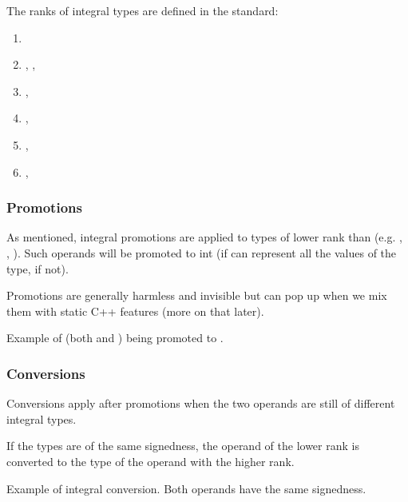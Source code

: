 The ranks of integral types are defined in the standard:

\begin{enumerate}
    \item {}
    \item {}, , 
    \item {}, 
    \item {}, 
    \item {}, 
    \item {}, 
\end{enumerate}

\subsubsection{Promotions}

As mentioned, integral promotions are applied to types of lower rank than  (e.g. , , ). Such operands will be promoted to int (if  can represent all the values of the type,  if not).

Promotions are generally harmless and invisible but can pop up when we mix them with static C++ features (more on that later).

\begin{codebox}[]{\href{https://compiler-explorer.com/z/P4EGeYxWc}{\ExternalLink}}
\footnotesize Example of  (both  and ) being promoted to .
\tcblower
{}
\end{codebox}

\subsubsection{Conversions}

Conversions apply after promotions when the two operands are still of different integral types.

If the types are of the same signedness, the operand of the lower rank is converted to the type of the operand with the higher rank.

\begin{codebox}[]{\href{https://compiler-explorer.com/z/91jhK9xdK}{\ExternalLink}}
\footnotesize Example of integral conversion. Both operands have the same signedness.
\tcblower
{}
\end{codebox}

